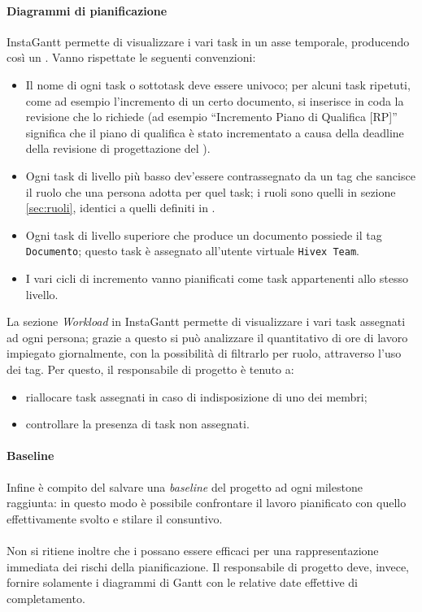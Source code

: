 		\paragraph{Diagrammi di pianificazione}
			InstaGantt permette di visualizzare i vari task in un asse temporale, producendo così un . 
			Vanno rispettate le seguenti convenzioni:
			\begin{itemize}
				\item Il nome di ogni task o sottotask deve essere univoco; per alcuni task ripetuti, come ad esempio l'incremento di un certo documento, si inserisce in coda la revisione che lo richiede (ad esempio “Incremento Piano di Qualifica [RP]” significa che il piano di qualifica è stato incrementato a causa della deadline della revisione di progettazione del \TV).
				\item Ogni task di livello più basso dev'essere contrassegnato da un tag che sancisce il ruolo che una persona adotta per quel task; i ruoli sono quelli in sezione \ref{sec:ruoli}, identici a quelli definiti in \PdP.
				\item Ogni task di livello superiore che produce un documento possiede il tag \texttt{Documento}; questo task è assegnato all'utente virtuale \texttt{Hivex Team}.
				\item I vari cicli di incremento vanno pianificati come task appartenenti allo stesso livello.
			\end{itemize}
			La sezione \emph{Workload} in InstaGantt permette di visualizzare i vari task assegnati ad ogni persona; grazie a questo si può analizzare il quantitativo di ore di lavoro impiegato giornalmente, con la possibilità di filtrarlo per ruolo, attraverso l'uso dei tag. Per questo, il responsabile di progetto è tenuto a:
			\begin{itemize}
				\item riallocare task assegnati in caso di indisposizione di uno dei membri;
				\item controllare la presenza di task non assegnati.
			\end{itemize}
			
		\paragraph{Baseline} 
			Infine è compito del  salvare una \emph{baseline} del progetto ad ogni milestone raggiunta: in questo modo è possibile confrontare il lavoro pianificato con quello effettivamente svolto e stilare il consuntivo.
		
		\paragraph{} 
			Non si ritiene inoltre che i  possano essere efficaci per una rappresentazione immediata dei rischi della pianificazione. Il responsabile di progetto deve, invece, fornire solamente i diagrammi di Gantt con le relative date effettive di completamento.

